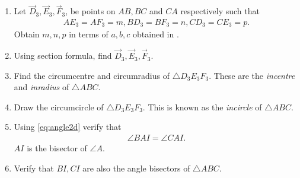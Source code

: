 \begin{enumerate}[label=\thesection.\arabic*.,ref=\thesection.\theenumi]
	\item Let $\vec{D}_3, \vec{E}_3, \vec{F}_3$, be points on $AB, BC$ and $CA$ respectively such that
		\begin{align}
			AE_3 = AF_3=m, BD_3 = BF_3=n, CD_3 = CE_3=p.
		\end{align}
	Obtain $m,n,p$ in terms of $a,b,c$ obtained in  
		.
 \\
 		
	\item Using section formula, find $\vec{D}_3, \vec{E}_3, \vec{F}_3$.
	\item Find the circumcentre and circumradius of $\triangle D_3E_3F_3$.  These are the {\em incentre} and {\em inradius} of $\triangle ABC$.
	\item Draw the circumcircle of $\triangle D_3E_3F_3$.  This is known as the {\em incircle} of $\triangle ABC$.
	\item Using 
    \eqref{eq:angle2d}
verify that 
		\begin{align}
			\angle BAI = \angle CAI.
		\end{align}
		$AI$ is the bisector of $\angle A$.  
	\item Verify that $BI, CI$ are also the angle bisectors of $\triangle ABC$.

		\iffalse


\end{enumerate}
